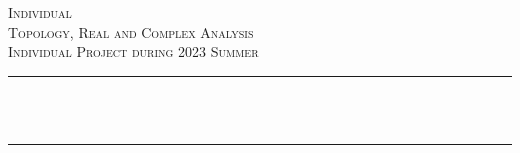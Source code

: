 \begin{titlepage}

  \newcommand{\HRule}{\rule{\linewidth}{0.5mm}} %
  
  
   
  
  \center %
  
  
  \textsc{\LARGE Individual}\\[1.5cm] %
  \textsc{\Large Topology, Real and Complex Analysis}\\[0.5cm] %
  \textsc{\large Individual Project during 2023 Summer}\\[0.5cm] %
  
  \makeatletter
  \HRule \\[0.4cm]
  { \huge \bfseries \@title}\\[0.4cm] %
  \HRule \\[1.5cm]
   
  
  

\end{titlepage}
